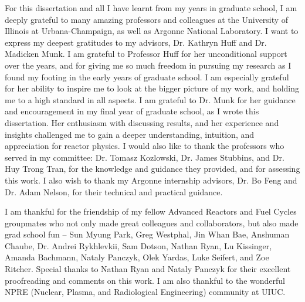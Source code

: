 For this dissertation and all I have learnt from my years in graduate school, 
I am deeply grateful to many amazing professors and colleagues at the University of 
Illinois at Urbana-Champaign, as well as Argonne National Laboratory. 
I want to express my deepest gratitudes to my advisors, Dr. Kathryn Huff and Dr. 
Madicken Munk. 
I am grateful to Professor Huff for her unconditional support over the years, and for 
giving me so much freedom in pursuing my research as I found my footing in the early 
years of graduate school. 
I am especially grateful for her ability to inspire me to look at the bigger picture of 
my work, and holding me to a high standard in all aspects.
I am grateful to Dr. Munk for her guidance and encouragement in my final year 
of graduate school, as I wrote this dissertation. 
Her enthusiasm with discussing results, and her experience and insights challenged me to 
gain a deeper understanding, intuition, and appreciation for reactor physics.  
I would also like to thank the professors who served in my committee: Dr. Tomasz 
Kozlowski, Dr. James Stubbins, and Dr. Huy Trong Tran, for the knowledge and guidance 
they provided, and for assessing this work. 
I also wish to thank my Argonne internship advisors, Dr. Bo Feng and Dr. Adam Nelson, 
for their technical and practical guidance. 

I am thankful for the friendship of my fellow Advanced Reactors and Fuel Cycles 
groupmates who not only made great colleagues and collaborators, but also made 
grad school fun -- Sun Myung Park, Greg Westphal, Jin Whan Bae, Anshuman Chaube, 
Dr. Andrei Rykhlevkii, Sam Dotson, Nathan Ryan, Lu Kissinger, Amanda Bachmann, 
Nataly Panczyk, Olek Yardas, Luke Seifert, and Zoe Ritcher. 
Special thanks to Nathan Ryan and Nataly Panczyk for their excellent proofreading 
and comments on this work. 
I am also thankful to the wonderful NPRE (Nuclear, Plasma, and Radiological Engineering) 
community at UIUC. 




